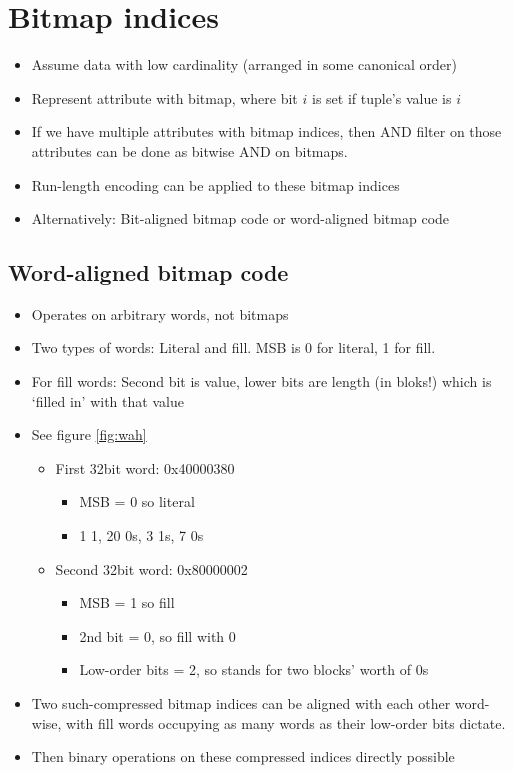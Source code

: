 \documentclass[a4paper]{scrreprt}
\begin{document}
\section{Bitmap indices}

\begin{itemize}
		\item Assume data with low cardinality (arranged in some canonical
				order)
		\item Represent attribute with bitmap, where bit $i$ is set if tuple's
				value is $i$
		\item If we have multiple attributes with bitmap indices, then AND
				filter on those attributes can be done as bitwise AND on
				bitmaps.
		\item Run-length encoding can be applied to these bitmap indices
		\item Alternatively: Bit-aligned bitmap code or word-aligned bitmap code
\end{itemize}

\subsection{Word-aligned bitmap code}

\begin{itemize}
		\item Operates on arbitrary words, not bitmaps
		\item Two types of words: Literal and fill. MSB is 0 for literal, 1 for fill.
		\item For fill words: Second bit is value, lower bits are length (in
				bloks!) which is `filled in' with that value
		\item See figure \ref{fig:wah}
				\begin{itemize}
						\item First 32bit word: 0x40000380
								\begin{itemize}
										\item MSB = 0 so literal
										\item 1 1, 20 0s, 3 1s, 7 0s
								\end{itemize}
						\item Second 32bit word: 0x80000002
								\begin{itemize}
										\item MSB = 1 so fill
										\item 2nd bit = 0, so fill with 0
										\item Low-order bits = 2, so stands for two blocks' worth of 0s
								\end{itemize}
				\end{itemize}
		\item Two such-compressed bitmap indices can be aligned with each other
				word-wise, with fill words occupying as many words as their
				low-order bits dictate.
		\item Then binary operations on these compressed indices directly possible
\end{itemize}
\end{document}
